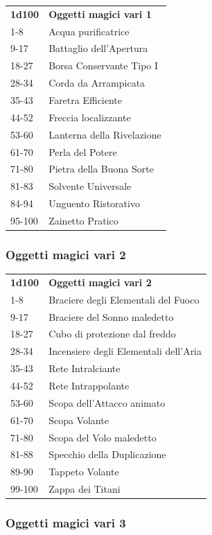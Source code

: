 \begin{multicols}{2}
\begin{tabularx}{0.45\textwidth}{lX}
\textbf{1d100} & \textbf{Oggetti magici vari 1}\\
1-8& Acqua purificatrice\\
9-17&Battaglio dell'Apertura\\
18-27&Borsa Conservante Tipo I\\
28-34& Corda da Arrampicata\\
35-43&Faretra Efficiente\\
44-52&Freccia localizzante\\
53-60&Lanterna della Rivelazione\\
61-70&Perla del Potere\\
71-80&Pietra della Buona Sorte\\
81-83&Solvente Universale\\
84-94&Unguento Ristorativo\\
95-100&Zainetto Pratico\\
\end{tabularx}

\subsubsection{Oggetti magici vari 2}


\begin{tabularx}{0.45\textwidth}{lX}
\textbf{1d100} & \textbf{Oggetti magici vari 2}\\
1-8 &Braciere degli Elementali del Fuoco\\
9-17 &Braciere del Sonno maledetto\\
18-27& Cubo di protezione dal freddo\\
28-34& Incensiere degli Elementali dell'Aria\\
35-43& Rete Intralciante\\
44-52& Rete Intrappolante\\
53-60& Scopa dell’Attacco animato\\
61-70& Scopa Volante\\
71-80& Scopa del Volo maledetto\\
81-88& Specchio della Duplicazione\\
89-90& Tappeto Volante\\
99-100& Zappa dei Titani\\
\end{tabularx}

\medskip
\subsubsection{Oggetti magici vari 3}


\end{multicols}
